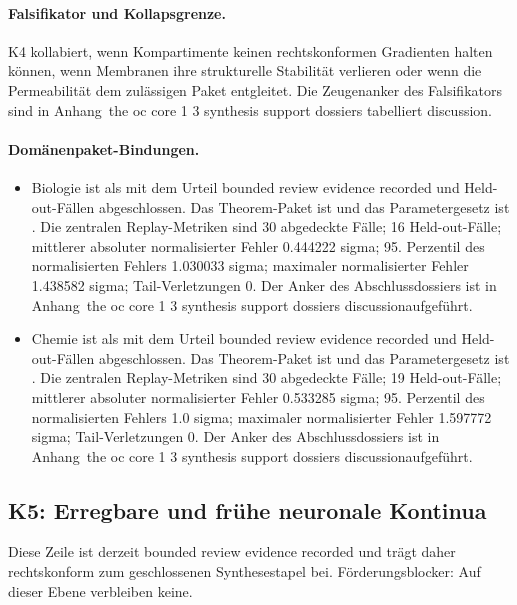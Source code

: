 \paragraph{Falsifikator und Kollapsgrenze.}
K4 kollabiert, wenn Kompartimente keinen rechtskonformen Gradienten halten können, wenn Membranen ihre strukturelle Stabilität verlieren oder wenn die Permeabilität dem zulässigen Paket entgleitet.
Die Zeugenanker des Falsifikators sind in Anhang~the oc core 1 3 synthesis support dossiers tabelliert discussion.

\paragraph{Domänenpaket-Bindungen.}
\begin{itemize}[leftmargin=1.6em,nosep]
\item Biologie ist als  mit dem Urteil bounded review evidence recorded und  Held-out-Fällen abgeschlossen. Das Theorem-Paket ist  und das Parametergesetz ist . Die zentralen Replay-Metriken sind 30 abgedeckte Fälle; 16 Held-out-Fälle; mittlerer absoluter normalisierter Fehler 0.444222 sigma; 95. Perzentil des normalisierten Fehlers 1.030033 sigma; maximaler normalisierter Fehler 1.438582 sigma; Tail-Verletzungen 0. Der Anker des Abschlussdossiers ist in Anhang~the oc core 1 3 synthesis support dossiers discussionaufgeführt.
\item Chemie ist als  mit dem Urteil bounded review evidence recorded und  Held-out-Fällen abgeschlossen. Das Theorem-Paket ist  und das Parametergesetz ist . Die zentralen Replay-Metriken sind 30 abgedeckte Fälle; 19 Held-out-Fälle; mittlerer absoluter normalisierter Fehler 0.533285 sigma; 95. Perzentil des normalisierten Fehlers 1.0 sigma; maximaler normalisierter Fehler 1.597772 sigma; Tail-Verletzungen 0. Der Anker des Abschlussdossiers ist in Anhang~the oc core 1 3 synthesis support dossiers discussionaufgeführt.
\end{itemize}

\subsection{K5: Erregbare und frühe neuronale Kontinua}
\label{sec:oc-core-1-3-synthesis-k5}
Diese Zeile ist derzeit bounded review evidence recorded und trägt daher rechtskonform zum geschlossenen Synthesestapel bei.
Förderungsblocker: Auf dieser Ebene verbleiben keine.

